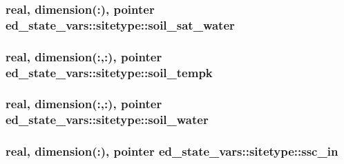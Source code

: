 \subsubsection[{\texorpdfstring{soil\+\_\+sat\+\_\+water}{soil_sat_water}}]{\setlength{\rightskip}{0pt plus 5cm}real, dimension(\+:), pointer ed\+\_\+state\+\_\+vars\+::sitetype\+::soil\+\_\+sat\+\_\+water}\hypertarget{structed__state__vars_1_1sitetype_aa2f6902a4c4fccb542e3d460f17d3793}{}\label{structed__state__vars_1_1sitetype_aa2f6902a4c4fccb542e3d460f17d3793}
\subsubsection[{\texorpdfstring{soil\+\_\+tempk}{soil_tempk}}]{\setlength{\rightskip}{0pt plus 5cm}real, dimension(\+:,\+:), pointer ed\+\_\+state\+\_\+vars\+::sitetype\+::soil\+\_\+tempk}\hypertarget{structed__state__vars_1_1sitetype_a4f3e0657e3b3f849bf1b1966d3d1c8ce}{}\label{structed__state__vars_1_1sitetype_a4f3e0657e3b3f849bf1b1966d3d1c8ce}
\subsubsection[{\texorpdfstring{soil\+\_\+water}{soil_water}}]{\setlength{\rightskip}{0pt plus 5cm}real, dimension(\+:,\+:), pointer ed\+\_\+state\+\_\+vars\+::sitetype\+::soil\+\_\+water}\hypertarget{structed__state__vars_1_1sitetype_aea18b1d599b8e55c4e22b16f360ae102}{}\label{structed__state__vars_1_1sitetype_aea18b1d599b8e55c4e22b16f360ae102}
\subsubsection[{\texorpdfstring{ssc\+\_\+in}{ssc_in}}]{\setlength{\rightskip}{0pt plus 5cm}real, dimension(\+:), pointer ed\+\_\+state\+\_\+vars\+::sitetype\+::ssc\+\_\+in}\hypertarget{structed__state__vars_1_1sitetype_a590e48e26dc75c3dd8c8202105507fee}{}\label{structed__state__vars_1_1sitetype_a590e48e26dc75c3dd8c8202105507fee}
